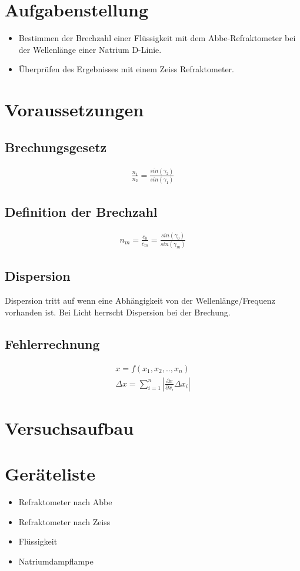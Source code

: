 \documentclass[a4paper]{article}
\begin{document}
\section{Aufgabenstellung}
\begin{itemize}
  \item Bestimmen der Brechzahl einer Flüssigkeit mit dem Abbe-Refraktometer bei der Wellenlänge einer Natrium D-Linie.
  \item Überprüfen des Ergebnisses mit einem Zeiss Refraktometer.
\end{itemize}

\section{Voraussetzungen}
  \subsection{Brechungsgesetz}
\begin{align}
  \frac{n_1}{n_2}=\frac{sin(\gamma_2)}{sin(\gamma_1)}
  \label{bechungsgesetz}
\end{align}
  \subsection{Definition der Brechzahl}
  \begin{align}
    n_m = \frac{c_0}{c_m}=\frac{sin(\gamma_0)}{sin(\gamma_m)}
    \label{brechzahl}
  \end{align}
  \subsection{Dispersion}
  Dispersion tritt auf wenn eine Abhängigkeit von der Wellenlänge/Frequenz vorhanden ist. Bei Licht herrscht Dispersion bei der Brechung.
  \subsection{Fehlerrechnung}
  \begin{align}
    x=f(x_1,x_2,..,x_n)\\
    \Delta x = \sum_{i=1}^n{\left |\frac{\partial  x}{\partial x_i}\Delta x_i\right |}
    \label{error}
  \end{align}

\section{Versuchsaufbau}
\section{Geräteliste}
\begin{itemize}
  \item Refraktometer nach Abbe 
  \item Refraktometer nach Zeiss
  \item Flüssigkeit
  \item Natriumdampflampe
\end{itemize}
\newpage
\end{document}
